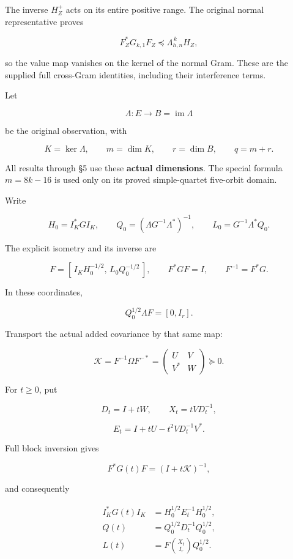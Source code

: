 \documentclass[11pt]{article}
\begin{document}
The inverse \(H_Z^+\) acts on its entire positive range. The original normal representative proves

\[
F_Z^*G_{k,1}F_Z\preceq \Lambda_{h,n}^{\,k}H_Z,
\]

so the value map vanishes on the kernel of the normal Gram. These are the supplied full cross-Gram identities, including their interference terms.

Let

\[
\Lambda:E\longrightarrow B=\operatorname{im}\Lambda
\]

be the original observation, with

\[
K=\ker\Lambda,\qquad m=\dim K,\qquad r=\dim B,\qquad q=m+r.
\]

All results through §5 use these \textbf{actual dimensions}. The special formula \(m=8k-16\) is used only on its proved simple-quartet five-orbit domain.

Write

\[
H_0=I_K^*GI_K,\qquad
Q_0=(\Lambda G^{-1}\Lambda^*)^{-1},\qquad
L_0=G^{-1}\Lambda^*Q_0.
\]

The explicit isometry and its inverse are

\[
F=[\,I_KH_0^{-1/2},\,L_0Q_0^{-1/2}\,],
\qquad
F^*GF=I,\qquad F^{-1}=F^*G.
\tag{3}
\]

In these coordinates,

\[
Q_0^{1/2}\Lambda F=[0,I_r].
\]

Transport the actual added covariance by that same map:

\[
\mathcal K=F^{-1}\Omega F^{-*}
=
\begin{pmatrix}
U&V\\V^*&W
\end{pmatrix}\succeq0.
\tag{4}
\]

For \(t\ge0\), put

\[
D_t=I+tW,\qquad
X_t=tVD_t^{-1},
\]

\[
E_t=I+tU-t^2VD_t^{-1}V^*.
\tag{5}
\]

Full block inversion gives

\[
F^*G(t)F=(I+t\mathcal K)^{-1},
\]

and consequently

\[
\boxed{
\begin{aligned}
I_K^*G(t)I_K&=H_0^{1/2}E_t^{-1}H_0^{1/2},\\
Q(t)&=Q_0^{1/2}D_t^{-1}Q_0^{1/2},\\
L(t)&=F\binom{X_t}{I_r}Q_0^{1/2}.
\end{aligned}}
\tag{6}
\]
\end{document}
